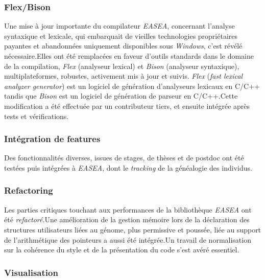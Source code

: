 \documentclass[french, 11pt]{memoir}
\begin{document}
\subsubsection{Flex/Bison}\label{flexbison}

Une mise à jour importante du compilateur \emph{EASEA}, concernant
l'analyse syntaxique et lexicale, qui embarquait de vieilles
technologies propriétaires payantes et abandonnées uniquement
disponibles sous \emph{Windows}, c'est révélé nécessaire.Elles ont été
remplacées en faveur d'outils standards dans le domaine de la
compilation, \emph{Flex} (analyseur lexical) et \emph{Bison} (analyseur
syntaxique), multiplateformes, robustes, activement mis à jour et
suivis. \emph{Flex }(\emph{fast lexical analyzer generator}) est un
logiciel de génération d'analyseurs lexicaux en C/C++ tandis que
\emph{Bison} est un logiciel de génération de parseur en C/C++.Cette
modification a été effectuée par un contributeur tiers, et ensuite
intégrée après tests et vérifications.

\subsubsection{Intégration de
	features}\label{intuxe9gration-de-features}

Des fonctionnalités diverses, issues de stages, de thèses et de postdoc
ont été testées puis intégrées à \emph{EASEA}, dont le \emph{tracking}
de la généalogie des individus.

\subsubsection{Refactoring}\label{refactoring}

Les parties critiques touchant aux performances de la bibliothèque
\emph{EASEA} ont été \emph{refactoré}.Une amélioration de la gestion
mémoire lors de la déclaration des structures utilisateurs liées au
génome, plus permissive et poussée, liée au support de l'arithmétique
des pointeurs a aussi été intégrée.Un travail de normalisation sur la
cohérence du style et de la présentation du code s'est avéré essentiel.

\subsubsection{Visualisation}\label{visualisation}
\end{document}
